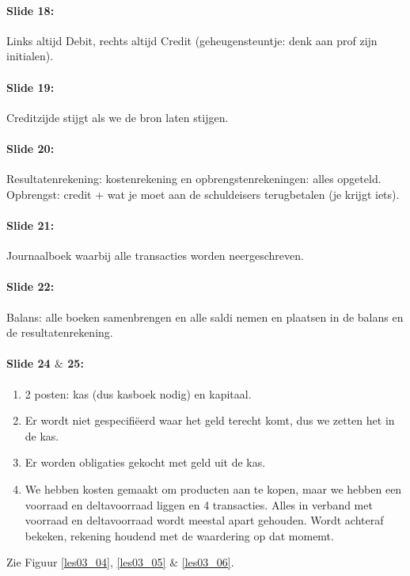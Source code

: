 \documentclass[10pt,a4paper]{report}
\begin{document}
\paragraph{Slide 18:} Links altijd Debit, rechts altijd Credit (geheugensteuntje: denk aan prof zijn initialen).

\paragraph{Slide 19:} Creditzijde stijgt als we de bron laten stijgen.

\paragraph{Slide 20:} Resultatenrekening: kostenrekening en opbrengstenrekeningen: alles opgeteld. Opbrengst: credit + wat je moet aan de schuldeisers terugbetalen (je krijgt iets).

\paragraph{Slide 21:} Journaalboek waarbij alle transacties worden neergeschreven.

\paragraph{Slide 22:} Balans: alle boeken samenbrengen en alle saldi nemen en plaatsen in de balans en de resultatenrekening.

\paragraph{Slide 24 $\&$ 25:}
\begin{enumerate}
\item 2 posten: kas (dus kasboek nodig) en kapitaal.
\item Er wordt niet gespecifi\"eerd waar het geld terecht komt, dus we zetten het in de kas.
\item Er worden obligaties gekocht met geld uit de kas.
\item We hebben kosten gemaakt om producten aan te kopen, maar we hebben een voorraad en deltavoorraad liggen en 4 transacties. Alles in verband met voorraad en deltavoorraad wordt meestal apart gehouden. Wordt achteraf bekeken, rekening houdend met de waardering op dat momemt.
\end{enumerate}

Zie Figuur \ref{les03_04}, \ref{les03_05} $\&$ \ref{les03_06}.
\end{document}
